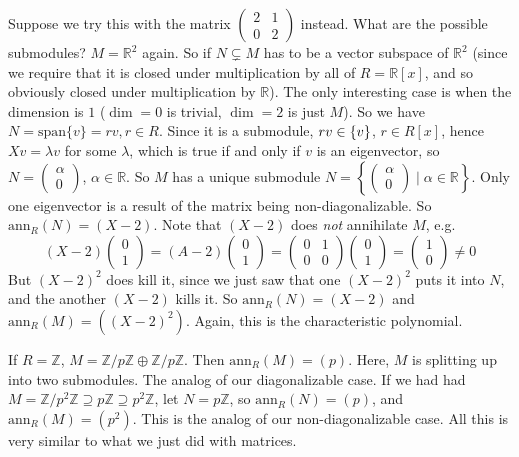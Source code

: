 \documentclass{article}
\theoremstyle{plain}
\theoremstyle{remark}
\newcommand{\Z}{{\mathbb Z}}
\newcommand{\R}{{\mathbb R}}
\begin{document}
Suppose we try this with the matrix $\begin{pmatrix} 2 & 1 \\ 0 & 2 \end{pmatrix}$ instead.
What are the possible submodules?
$M = \R^2$ again.
So if $N \subsetneq M$ has to be a vector subspace of $\R^2$
(since we require that it is closed under multiplication by all of $R = \R[x]$,
and so obviously closed under multiplication by $\R$).
The only interesting case is when the dimension is $1$
($\dim = 0$ is trivial, $\dim = 2$ is just $M$).
So we have $N = \mathrm{span}\{v\} = rv, r\in R$.
Since it is a submodule, $rv \in \mathrm\{v\}$, $r \in R[x]$,
hence $Xv = \lambda v$ for some $\lambda$,
which is true if and only if $v$ is an eigenvector,
so $N = \begin{pmatrix} \alpha \\ 0 \end{pmatrix}$, $\alpha \in \R$.
So $M$ has a unique submodule
$N = \left\{\begin{pmatrix} \alpha \\ 0 \end{pmatrix} \mid \alpha \in \R\right\}$.
Only one eigenvector is a result of the matrix being non-diagonalizable.
So $\mathrm{ann}_R(N) = (X-2)$.
Note that $(X-2)$ does \emph{not} annihilate $M$,
e.g.
\[
	(X-2)\begin{pmatrix}0\\1\end{pmatrix} = (A-2)\begin{pmatrix}0\\1\end{pmatrix}
	= \begin{pmatrix}0 & 1 \\ 0 & 0\end{pmatrix}\begin{pmatrix}0 \\ 1 \end{pmatrix}
	= \begin{pmatrix} 1 \\ 0 \end{pmatrix} \neq 0
\]
But $(X-2)^2$ does kill it,
since we just saw that one $(X-2)^2$ puts it into $N$,
and the another $(X-2)$ kills it.
So $\mathrm{ann}_R(N) = (X-2)$ and $\mathrm{ann}_R(M) = \left((X-2)^2\right)$.
Again, this is the characteristic polynomial.

If $R = \Z$, $M = \Z/p\Z \oplus \Z/p\Z$.
Then $\mathrm{ann}_R(M) = (p)$.
Here, $M$ is splitting up into two submodules.
The analog of our diagonalizable case.
If we had had $M = \Z/p^2\Z \supseteq p\Z \supseteq p^2\Z$,
let $N = p\Z$,
so $\mathrm{ann}_R(N) = (p)$, and $\mathrm{ann}_R(M) = (p^2)$.
This is the analog of our non-diagonalizable case.
All this is very similar to what we just did with matrices.
\end{document}
